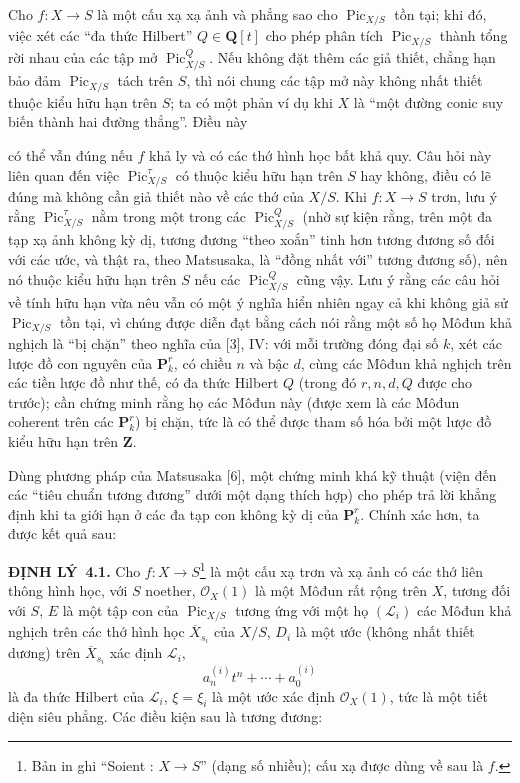 \documentclass[11pt,twoside,openany]{book}
\numberwithin{equation}{section}
\newcommand{\src}[1]{%
  \phantomsection\hypertarget{src:\fgasourceid:#1}{}%
  \marginpar{\raggedleft\footnotesize\sffamily #1}%
}
\newcommand{\fgasourceid}{unset}
\newcommand{\result}[2]{\par\medskip\noindent\textbf{#1\if\relax\detokenize{#2}\relax\else\ #2\fi.}\quad}
\begin{document}
Cho $f:X\longrightarrow S$ là một cấu xạ xạ ảnh và phẳng sao cho
$\operatorname{Pic}_{X/S}$ tồn tại; khi đó, việc xét các ``đa thức Hilbert''
$Q\in\mathbf Q[t]$ cho phép phân tích $\operatorname{Pic}_{X/S}$ thành tổng
rời nhau của các tập mở $\operatorname{Pic}_{X/S}^Q$. Nếu không đặt thêm các
giả thiết, chẳng hạn bảo đảm $\operatorname{Pic}_{X/S}$ tách trên $S$, thì
nói chung các tập mở này không nhất thiết thuộc kiểu hữu hạn trên $S$; ta có
một phản ví dụ khi $X$ là ``một đường conic suy biến thành hai đường thẳng''.
Điều này
\src{242}
có thể vẫn đúng nếu $f$ khả ly và có các thớ hình học bất khả quy. Câu hỏi này
liên quan đến việc $\operatorname{Pic}_{X/S}^\tau$ có thuộc kiểu hữu hạn trên
$S$ hay không, điều có lẽ đúng mà không cần giả thiết nào về các thớ của
$X/S$. Khi $f:X\longrightarrow S$ trơn, lưu ý rằng
$\operatorname{Pic}_{X/S}^\tau$ nằm trong một trong các
$\operatorname{Pic}_{X/S}^Q$ (nhờ sự kiện rằng, trên một đa tạp xạ ảnh không
kỳ dị, tương đương ``theo xoắn'' tinh hơn tương đương số đối với các ước, và
thật ra, theo Matsusaka, là ``đồng nhất với'' tương đương số), nên nó thuộc
kiểu hữu hạn trên $S$ nếu các $\operatorname{Pic}_{X/S}^Q$ cũng vậy. Lưu ý
rằng các câu hỏi về tính hữu hạn vừa nêu vẫn có một ý nghĩa hiển nhiên ngay cả khi
không giả sử $\operatorname{Pic}_{X/S}$ tồn tại, vì chúng được diễn đạt bằng
cách nói rằng một số họ Môđun khả nghịch là ``bị chặn'' theo nghĩa của [3],
IV: với mỗi trường đóng đại số $k$, xét các lược đồ con nguyên của
$\mathbf P_k^r$, có chiều $n$ và bậc $d$, cùng các Môđun khả nghịch trên các
tiền lược đồ như thế, có đa thức Hilbert $Q$ (trong đó $r,n,d,Q$ được cho
trước); cần chứng minh rằng họ các Môđun này (được xem là các Môđun coherent
trên các $\mathbf P_k^r$) bị chặn, tức là có thể được tham số hóa bởi một lược
đồ kiểu hữu hạn trên $\mathbf Z$.

Dùng phương pháp của Matsusaka [6], một chứng minh khá kỹ thuật (viện đến các
``tiêu chuẩn tương đương'' dưới một dạng thích hợp) cho phép trả lời khẳng định
khi ta giới hạn ở các đa tạp con không kỳ dị của $\mathbf P_k^r$. Chính xác
hơn, ta được kết quả sau:

\result{ĐỊNH LÝ}{4.1} Cho $f:X\longrightarrow S$\footnote{Bản in ghi
``Soient : $X\longrightarrow S$'' (dạng số nhiều); cấu xạ được dùng về sau là
$f$.} là một cấu xạ trơn và xạ ảnh có các thớ liên thông hình học, với $S$
noether, $\mathcal O_X(1)$ là một Môđun rất rộng trên $X$, tương đối với $S$,
$E$ là một tập con của $\operatorname{Pic}_{X/S}$ tương ứng với một họ
$(\mathcal L_i)$ các Môđun khả nghịch trên các thớ hình học
$\overline X_{s_i}$ của $X/S$, $D_i$ là một ước (không nhất thiết dương) trên
$\overline X_{s_i}$ xác định $\mathcal L_i$,
\[
a_n^{(i)}t^n+\cdots+a_0^{(i)}
\]
là đa thức Hilbert của $\mathcal L_i$, $\xi=\xi_i$ là một ước xác định
$\mathcal O_X(1)$, tức là một tiết diện siêu phẳng. Các điều kiện sau là tương
đương:
\end{document}
